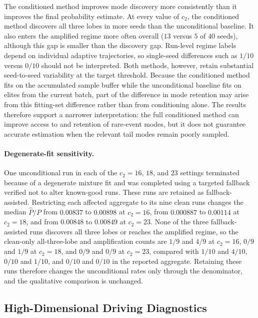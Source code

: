 The conditioned method improves mode discovery more consistently than it improves the final probability estimate. At every value of $c_2$, the conditioned method discovers all three lobes in more seeds than the unconditional baseline. It also enters the amplified regime more often overall ($13$ versus $5$ of $40$ seeds), although this gap is smaller than the discovery gap. Run-level regime labels depend on individual adaptive trajectories, so single-seed differences such as $1/10$ versus $0/10$ should not be interpreted. Both methods, however, retain substantial seed-to-seed variability at the target threshold. Because the conditioned method fits on the accumulated sample buffer while the unconditional baseline fits on elites from the current batch, part of the difference in mode retention may arise from this fitting-set difference rather than from conditioning alone. The results therefore support a narrower interpretation: the full conditioned method can improve access to and retention of rare-event modes, but it does not guarantee accurate estimation when the relevant tail modes remain poorly sampled.

\paragraph{Degenerate-fit sensitivity.}
One unconditional run in each of the $c_2=16$, $18$, and $23$ settings terminated because of a degenerate mixture fit and was completed using a targeted fallback verified not to alter known-good runs. These runs are retained as fallback-assisted. Restricting each affected aggregate to its nine clean runs changes the median $\widehat P/P$ from $0.00837$ to $0.00898$ at $c_2=16$, from $0.000887$ to $0.00114$ at $c_2=18$, and from $0.00848$ to $0.00849$ at $c_2=23$. None of the three fallback-assisted runs discovers all three lobes or reaches the amplified regime, so the clean-only all-three-lobe and amplification counts are $1/9$ and $4/9$ at $c_2=16$, $0/9$ and $1/9$ at $c_2=18$, and $0/9$ and $0/9$ at $c_2=23$, compared with $1/10$ and $4/10$, $0/10$ and $1/10$, and $0/10$ and $0/10$ in the reported aggregate. Retaining these runs therefore changes the unconditional rates only through the denominator, and the qualitative comparison is unchanged.

\subsection{High-Dimensional Driving Diagnostics}
\label{app:high-diagnostics}

